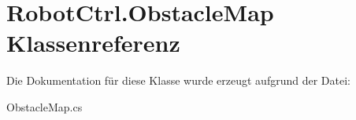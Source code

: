 \hypertarget{class_robot_ctrl_1_1_obstacle_map}{
\section{RobotCtrl.ObstacleMap Klassenreferenz}
\label{class_robot_ctrl_1_1_obstacle_map}
}


Die Dokumentation für diese Klasse wurde erzeugt aufgrund der Datei:\begin{DoxyCompactItemize}
\item 
ObstacleMap.cs\end{DoxyCompactItemize}
